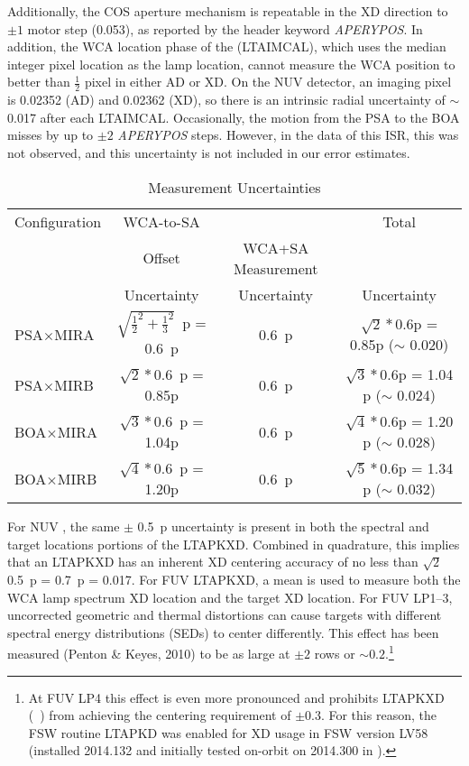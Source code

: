 Additionally, the COS aperture mechanism is repeatable in the XD direction to $\pm 1$ motor step (0.053\arcsec), as reported by the header keyword \textit{APERYPOS}. In addition, the WCA location phase of the  (\textsc{LTAIMCAL}), which uses the median integer pixel location as the lamp location, cannot measure the WCA position to better than $\frac{1}{2}$ pixel in either AD or XD.
On the NUV detector, an imaging pixel is 0.02352\arcsec{} (AD) and 0.02362\arcsec{} (XD), so there is an intrinsic radial uncertainty of $\sim$0.017\arcsec{} after each \textsc{LTAIMCAL}.
Occasionally, the motion from the PSA to the BOA misses by up to $\pm 2$ \textit{APERYPOS} steps. However, in the data of this ISR, this was not observed, and this uncertainty is not included in our error estimates.

\begin{table}[htb]
\centering
	\caption{ Measurement Uncertainties\label{tab:unc}}
	\begin{tabular}{lccc}
	\toprule
	Configuration &	  WCA-to-SA     	& \tacq{IMAGE}  & Total \\
				  &    Offset           & WCA+SA Measurement   & \tacq{IMAGE} \\
				  &  Uncertainty      &  Uncertainty   & Uncertainty \\
	\midrule
	PSA$\times$MIRA &	$\sqrt{\frac{1}{2}^2 + \frac{1}{3}^2 }$~p = 0.6~p	& 0.6~p	& $\sqrt{2} * 0.6$p = 0.85p ($\sim$ 0.020\arcsec) \\
	PSA$\times$MIRB &	$\sqrt{2} * 0.6$~p =	0.85p		& 0.6~p & $\sqrt{3} * 0.6$p = 1.04 p ($\sim$ 0.024\arcsec) \\
	BOA$\times$MIRA &	$\sqrt{3} * 0.6$~p =	1.04p		& 0.6~p & $\sqrt{4} * 0.6$p = 1.20 p ($\sim$ 0.028\arcsec) \\
	BOA$\times$MIRB &	$\sqrt{4} * 0.6$~p =	1.20p		& 0.6~p & $\sqrt{5} * 0.6$p = 1.34 p ($\sim$ 0.032\arcsec)\\
	\bottomrule
	\end{tabular}
\end{table}
For NUV , the same $\pm$ 0.5~p uncertainty is present in both the spectral and target locations portions of the \textsc{LTAPKXD}. Combined in quadrature, this implies that
an \textsc{LTAPKXD} has an inherent XD centering accuracy of no less than $\sqrt{2}$ 0.5~p = 0.7~p = 0.017\arcsec. For FUV \textsc{LTAPKXD}, a mean is used to measure both the WCA lamp spectrum XD location and the target XD location.
For FUV LP1--3, uncorrected geometric and thermal distortions can cause targets with different spectral energy distributions (SEDs) to center differently. This effect has been measured (Penton \& Keyes, 2010) to be as large at $\pm 2$ rows or
$\sim 0.2$\arcsec.\footnote{At FUV LP4 this effect is even more pronounced and prohibits \textsc{LTAPKXD} (\numposone~) from achieving the centering requirement of $\pm 0.3$\arcsec. For this reason, the  FSW routine \textsc{LTAPKD} was enabled
for XD usage in FSW version LV58 (installed 2014.132 and initially tested on-orbit on 2014.300 in ).}
